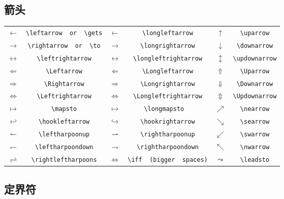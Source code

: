 \subsection{箭头}

\begin{table}[H]
\centering
\begin{tabular}{*{6}{c}}
$\leftarrow  $  &  \verb|\leftarrow  or  \gets|  &$\longleftarrow  $  &  \verb|\longleftarrow|  &$\uparrow  $  &  \verb|\uparrow|  \\
$\rightarrow  $  &  \verb|\rightarrow  or  \to|  &$  \longrightarrow$  &  \verb|\longrightarrow|  &$  \downarrow$  &  \verb|\downarrow|  \\
$\leftrightarrow  $  &  \verb|\leftrightarrow|  &$\longleftrightarrow  $  &  \verb|\longleftrightarrow|  &$\updownarrow  $  &  \verb|\updownarrow|  \\
$  \Leftarrow$  &  \verb|\Leftarrow|  &$\Longleftarrow  $  &  \verb|\Longleftarrow|  &$\Uparrow  $  &  \verb|\Uparrow|  \\
$\Rightarrow  $  &  \verb|\Rightarrow|  &$\Longrightarrow  $  &  \verb|\Longrightarrow|  &$  \Downarrow$  &  \verb|\Downarrow|  \\
$\Leftrightarrow  $  &  \verb|\Leftrightarrow|  &$  \Longleftrightarrow$  &  \verb|\Longleftrightarrow|  &$  \Updownarrow$  &  \verb|\Updownarrow|  \\
$\mapsto  $  &  \verb|\mapsto|  &$\longmapsto    $  &  \verb|\longmapsto  |  &$\nearrow  $  &  \verb|\nearrow|  \\
$\hookleftarrow  $  &  \verb|\hookleftarrow|  &$\hookrightarrow  $  &  \verb|\hookrightarrow|  &$  \searrow$  &  \verb|\searrow|  \\
$  \leftharpoonup$  &  \verb|\leftharpoonup|  &$\rightharpoonup  $  &  \verb|\rightharpoonup|  &$\swarrow  $  &  \verb|\swarrow|  \\
$\leftharpoondown$  &  \verb|\leftharpoondown|  &$  \rightharpoondown$  &  \verb|\rightharpoondown|  &$\nwarrow  $  &  \verb|\nwarrow|  \\
$\rightleftharpoons  $  &  \verb|\rightleftharpoons|  &$  \iff$  &  \verb|\iff  (bigger  spaces)|  &$\leadsto  $  &  \verb|\leadsto|\hyperlink{latexsym}{\footnotemark[1]}  \\
\end{tabular}
\end{table}

\subsection{定界符}

